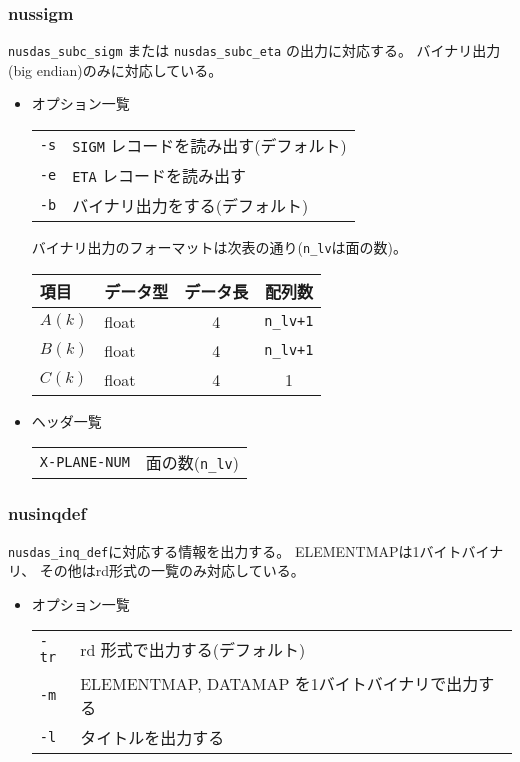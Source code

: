 \subsubsection{nussigm}
{\tt nusdas\_subc\_sigm} または {\tt nusdas\_subc\_eta} の出力に対応する。
バイナリ出力(big endian)のみに対応している。
\begin{itemize}
\item オプション一覧\\
\begin{tabular}{ll}
{\tt -s} & {\tt SIGM} レコードを読み出す(デフォルト) \\
{\tt -e} & {\tt ETA} レコードを読み出す \\
{\tt -b} & バイナリ出力をする(デフォルト)
\end{tabular}

バイナリ出力のフォーマットは次表の通り({\tt n\_lv}は面の数)。

\begin{tabular}{l|l|c|c}\hline
項目  & データ型 & データ長 & 配列数\\\hline
$A(k)$ & float   & 4        & {\tt n\_lv+1} \\
$B(k)$ & float   & 4        & {\tt n\_lv+1} \\
$C(k)$ & float   & 4        & 1 \\\hline
\end{tabular}

\item ヘッダ一覧\\
\begin{tabular}{lp{10cm}}
{\tt X-PLANE-NUM} & 面の数({\tt n\_lv})\\
\end{tabular}

\end{itemize}


\subsubsection{nusinqdef}
{\tt nusdas\_inq\_def}に対応する情報を出力する。
ELEMENTMAPは1バイトバイナリ、
その他はrd形式の一覧のみ対応している。
\begin{itemize}
\item オプション一覧\\
\begin{tabular}{ll}
{\tt -tr} & rd 形式で出力する(デフォルト) \\
{\tt -m} & ELEMENTMAP, DATAMAP を1バイトバイナリで出力する\\
{\tt -l} & タイトルを出力する \\
\end{tabular}

\end{itemize}

